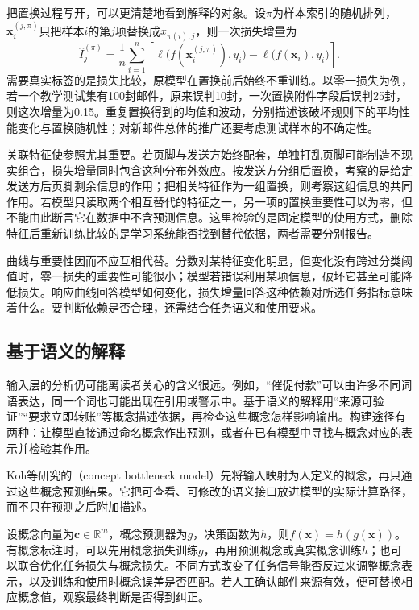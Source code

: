 把置换过程写开，可以更清楚地看到解释的对象。设$\pi$为样本索引的随机排列，$\bm{x}_i^{(j,\pi)}$只把样本$i$的第$j$项替换成$x_{\pi(i),j}$，则一次损失增量为
\begin{equation}
 \widehat I_j^{(\pi)}
 =\frac1n\sum_{i=1}^n\left[
 \ell\bigl(f(\bm{x}_i^{(j,\pi)}),y_i\bigr)
 -\ell\bigl(f(\bm{x}_i),y_i\bigr)\right].
 \label{eq:interpretability-permutation}
\end{equation}
需要真实标签的是损失比较，原模型在置换前后始终不重训练。以零一损失为例，若一个教学测试集有100封邮件，原来误判10封，一次置换附件字段后误判25封，则这次增量为0.15。重复置换得到的均值和波动，分别描述该破坏规则下的平均性能变化与置换随机性；对新邮件总体的推广还要考虑测试样本的不确定性。

关联特征使参照尤其重要。若页脚与发送方始终配套，单独打乱页脚可能制造不现实组合，损失增量同时包含这种分布外效应。按发送方分组后置换，考察的是给定发送方后页脚剩余信息的作用；把相关特征作为一组置换，则考察这组信息的共同作用。若模型只读取两个相互替代的特征之一，另一项的置换重要性可以为零，但不能由此断言它在数据中不含预测信息。这里检验的是固定模型的使用方式，删除特征后重新训练比较的是学习系统能否找到替代依据，两者需要分别报告。

曲线与重要性因而不应互相代替。分数对某特征变化明显，但变化没有跨过分类阈值时，零一损失的重要性可能很小；模型若错误利用某项信息，破坏它甚至可能降低损失。响应曲线回答模型如何变化，损失增量回答这种依赖对所选任务指标意味着什么。要判断依赖是否合理，还需结合任务语义和使用要求。

\subsection{基于语义的解释}
\label{sec:interpretability-global-concepts}

输入层的分析仍可能离读者关心的含义很远。例如，“催促付款”可以由许多不同词语表达，同一个词也可能出现在引用或警示中。基于语义的解释用“来源可验证”“要求立即转账”等概念描述依据，再检查这些概念怎样影响输出。构建途径有两种：让模型直接通过命名概念作出预测，或者在已有模型中寻找与概念对应的表示并检验其作用。

Koh等研究的（concept bottleneck model）先将输入映射为人定义的概念，再只通过这些概念预测结果。它把可查看、可修改的语义接口放进模型的实际计算路径，而不只在预测之后附加描述。

设概念向量为$\bm{c}\in\mathbb R^m$，概念预测器为$g$，决策函数为$h$，则$f(\bm{x})=h(g(\bm{x}))$。有概念标注时，可以先用概念损失训练$g$，再用预测概念或真实概念训练$h$；也可以联合优化任务损失与概念损失。不同方式改变了任务信号能否反过来调整概念表示，以及训练和使用时概念误差是否匹配。若人工确认邮件来源有效，便可替换相应概念值，观察最终判断是否得到纠正。

